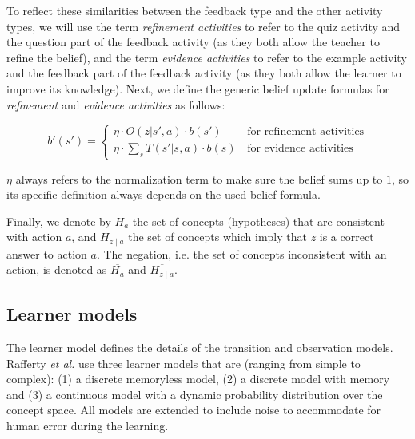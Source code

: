 \vspace{2mm}
To reflect these similarities between the feedback type and the other activity types, we will use the term \textit{refinement activities} to refer to the quiz activity and the question part of the feedback activity (as they both allow the teacher to refine the belief), and the term \textit{evidence activities} to refer to the example activity and the feedback part of the feedback activity (as they both allow the learner to improve its knowledge). 
Next, we define the generic belief update formulas for \textit{refinement} and \textit{evidence activities} as follows:

\begin{equation}
    b'(s') = \begin{cases}
        \eta \cdot O(z|s',a) \cdot b(s')    & \, \text{for refinement activities} \\
        \eta \cdot \sum_s T(s'|s, a) \cdot b(s)    & \, \text{for evidence activities}
    \end{cases}
    \label{eq:belief-update-types}
\end{equation}

$\eta$ always refers to the normalization term to make sure the belief sums up to $1$, so its specific definition always depends on the used belief formula.

Finally, we denote by $H_a$ the set of concepts (hypotheses) that are consistent with action $a$, and $H_{z \mid a}$ the set of concepts which imply that $z$ is a correct answer to action $a$. The negation, i.e. the set of concepts inconsistent with an action, is denoted as $\overline{H_a}$ and $\overline{H_{z \mid a}}$.


\subsection{Learner models}

The learner model defines the details of the transition and observation models.
Rafferty \textit{et al.} use three learner models that are (ranging from simple to complex): (1) a discrete memoryless model, (2) a discrete model with memory and (3) a continuous model with a dynamic probability distribution over the concept space. All models are extended to include noise to accommodate for human error during the learning.

